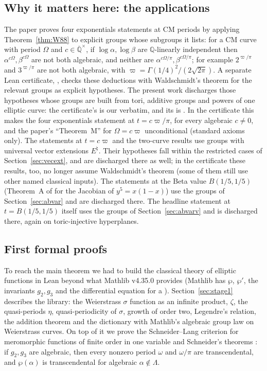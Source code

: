 \documentclass[11pt]{amsart}
\theoremstyle{definition}
\theoremstyle{remark}
\numberwithin{equation}{section}
\newcommand{\QQ}{\mathbb{Q}}
\newcommand{\Qbar}{\overline{\mathbb{Q}}}
\newcommand{\vp}{\varpi}
\begin{document}
\subsection{Why it matters here: the applications}
The paper \cite{Note} proves four exponentials statements at CM periods by applying
Theorem~\ref{thm:W88} to explicit groups whose subgroups it lists: for a CM curve with period
$\Omega$ and $c\in\Qbar^\times$, if $\log\alpha,\log\beta$ are $\QQ$-linearly independent then
$\alpha^{c\Omega},\beta^{c\Omega}$ are not both algebraic, and neither are $\alpha^{c\Omega/\pi},
\beta^{c\Omega/\pi}$; for example $2^{\vp/\pi}$ and $3^{\vp/\pi}$ are not both algebraic, with
$\vp=\Gamma(1/4)^2/(2\sqrt{2\pi})$. A separate Lean certificate, 
\cite{LeanMstar}, checks these deductions with Waldschmidt's theorem for the relevant groups as
explicit hypotheses. The present work discharges those hypotheses whose groups are built from
tori, additive groups and powers of one elliptic curve: the certificate's  is our
 verbatim, and its  is . In
the certificate this makes the four exponentials statement at $t=c\vp/\pi$, for every algebraic
$c\ne0$, and the paper's ``Theorem~M'' for $\Omega=c\vp$ unconditional (standard axioms only). The
statements at $t=c\vp$ and the two-curve results use groups with universal vector extensions
$E^\natural$. Their hypotheses fall within the restricted cases of Section~\ref{sec:vecext}, and are
discharged there as well; in the certificate these results, too, no longer assume Waldschmidt's
theorem (some of them still use other named classical inputs). The statements at the Beta value
$B(1/5,1/5)$ (Theorem~A of \cite{Note} for the Jacobian of $y^5=x(1-x)$) use the groups of
Section~\ref{sec:abvar} and are discharged there. The headline statement at $t=B(1/5,1/5)$ itself uses the groups of
Section~\ref{sec:abvarv} and is discharged there, again on toric-injective hyperplanes.

\subsection{First formal proofs}
To reach the main theorem we had to build the classical theory of elliptic functions in Lean
beyond what Mathlib v4.35.0 provides (Mathlib has $\wp$, $\wp'$, the invariants $g_2,g_3$ and the
differential equation for a ). Section~\ref{sec:stage1} describes the library: the
Weierstrass $\sigma$ function as an infinite product, $\zeta$, the quasi-periods $\eta$,
quasi-periodicity of $\sigma$, growth of order two, Legendre's relation, the addition theorem and the
dictionary with Mathlib's algebraic group law on Weierstrass curves. On top of it we prove the
Schneider--Lang criterion for meromorphic functions of finite order in one variable and Schneider's
theorems \cite{Schneider1937}: if $g_2,g_3$ are algebraic, then every nonzero period $\omega$ and
$\omega/\pi$ are transcendental, and $\wp(\alpha)$ is transcendental for algebraic $\alpha\notin\Lambda$.
\end{document}
